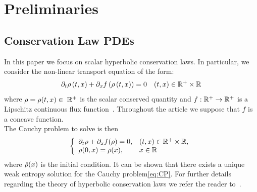 \section{Preliminaries\label{sec:Preliminaries}}


\subsection{Conservation Law PDEs\label{sub:Hyperbolic-PDE's}}

In this paper we focus on scalar hyperbolic conservation laws. In particular, we consider the non-linear transport equation of the form:
\begin{equation}
\partial_t\rho\left(t,x\right)+\partial_x f\left(\rho\left(t,x\right)\right)=0 \quad (t,x) \in \mathbb{R}^+ \times \mathbb{R}\label{eq:cons}
\end{equation}
where $\rho=\rho(t,x) \in \; \mathbb{R}^+$ is the scalar conserved quantity and $f:\mathbb{R}^+\rightarrow \mathbb{R}^+$ is a Lipschitz continuous flux function~\cite{Bressan2000Hyperbolic}. Throughout the article we suppose that $f$ is a concave function. \\
The Cauchy problem to solve is then 
\begin{equation}
	\label{eq:CP}
		\left\{
		\begin{array}{ll}
		\partial_t \rho+ \partial_x f(\rho) =0, & (t,x)\in\mathbb{R}^+\times \mathbb{R},\\
		\rho(0,x)=\bar{\rho}(x), & x \in \mathbb{R}\\
		\end{array}
		\right.
\end{equation}
where $\bar{\rho}(x)$ is the initial condition.
It can be shown that there exists a unique weak entropy solution for the Cauchy problem\eqref{eq:CP}. For further details regarding the theory of hyperbolic conservation laws we refer the reader to~\cite{garavello2006traffic,Evans1998}.


